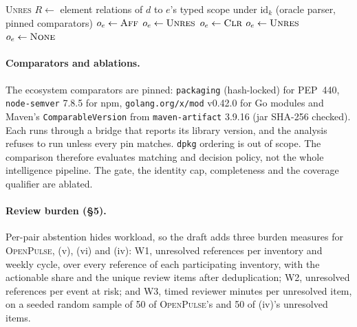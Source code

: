 \documentclass[11pt,a4paper]{article}
\newcommand{\op}{\textsc{OpenPulse}}
\newcommand{\code}[1]{\texttt{#1}}
\begin{document}
\begin{algorithm}[t]
\begin{algorithmic}[1]
      \textsc{Unres}
  \EndFor
  \State \Return {}
\EndFunction
{} 
    \State $R\gets$ element relations of $d$ to $e$'s typed scope under
      $\mathrm{id}_k$ (oracle parser, pinned comparators)
      \State $o_e\gets\textsc{Aff}$
      \State $o_e\gets\textsc{Unres}$
      \State $o_e\gets\textsc{Clr}$
      \State $o_e\gets\textsc{Unres}$
    \Else
      \State $o_e\gets\textsc{None}$
    \EndIf
  \EndFor
  \State \Return {}
\EndFunction
\end{algorithmic}
\end{algorithm}

\paragraph{Comparators and ablations.} The ecosystem comparators are
pinned: \code{packaging} (hash-locked) for PEP~440, \code{node-semver}
7.8.5 for npm, \code{golang.org/x/mod} v0.42.0 for Go modules and
Maven's \code{ComparableVersion} from \code{maven-artifact} 3.9.16
(jar SHA-256 checked). Each runs through a bridge that reports its
library version, and the analysis refuses to run unless every pin
matches. \code{dpkg} ordering is out of scope. The comparison therefore
evaluates matching and decision policy, not the whole intelligence
pipeline. The gate, the identity cap, completeness and the coverage
qualifier are ablated.

\paragraph{Review burden (\S5).} Per-pair
abstention hides workload, so the draft adds three burden measures for
\op{}, (v), (vi) and (iv): W1, unresolved references per inventory and
weekly cycle, over every reference of each participating inventory,
with the actionable share and the unique review items after
deduplication; W2, unresolved references per event at risk; and W3,
timed reviewer minutes per unresolved item, on a seeded random sample
of 50 of \op{}'s and 50 of (iv)'s unresolved items.
\end{document}
